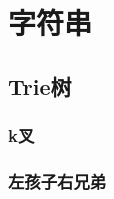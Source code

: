
\chapter{字符串}
\label{string}



\section{Trie树}

\subsection{k叉}


\subsection{左孩子右兄弟}





\endinput %

